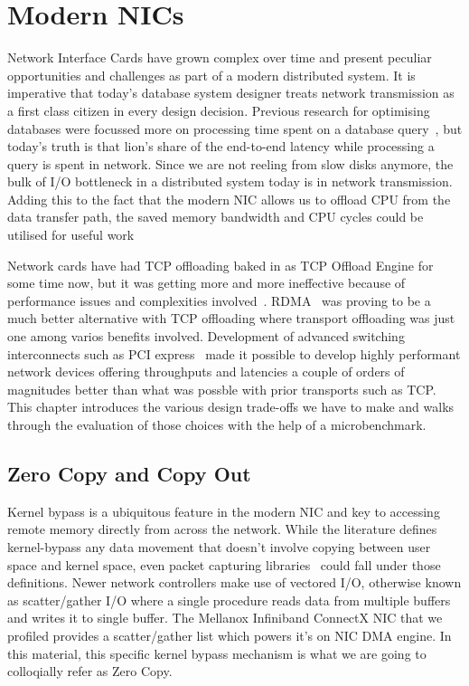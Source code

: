 \chapter{Modern NICs}
\label{chap:modernnics}
Network Interface Cards have grown complex over time and present peculiar opportunities and 
challenges as part of a modern distributed system. It is imperative that today's
database system designer treats network transmission as a first class citizen in every design decision.
Previous research for optimising databases were focussed more on processing time spent on a 
database query~\cite{dbmsproctime}, but today's truth is that lion's share of the end-to-end latency
while processing a query is spent in network.
Since we are not reeling from slow disks anymore, the bulk of I/O bottleneck in a distributed system today is in network transmission.
Adding this to the fact that the modern NIC allows us to offload CPU from the data transfer path,
the saved memory bandwidth and CPU cycles could be utilised for useful work 

Network cards have had TCP offloading baked in as TCP Offload Engine for some time now, but it was getting 
more and more ineffective because of performance issues and complexities involved~\cite{tcpoffload}.
RDMA~\cite{rdmapatent,rdmacase,rdma} was proving to be a much better alternative with TCP offloading where
transport offloading was just one among varios benefits involved. Development of advanced switching 
interconnects such as PCI express~\cite{pcie} made it possible to develop highly performant 
network devices offering throughputs and latencies a couple of orders of magnitudes better
than what was possble with prior transports such as TCP. This chapter introduces the various design 
trade-offs we have to make and walks through the evaluation of those choices with the help of a microbenchmark.


\section{Zero Copy and Copy Out}
Kernel bypass is a ubiquitous feature in the modern NIC and key to accessing remote memory directly 
from across the network. While the literature defines kernel-bypass any data movement that doesn't 
involve copying between user space and kernel space, even packet capturing libraries~\cite{pcap} could fall
under those definitions. Newer network controllers make use of vectored I/O, otherwise known as scatter/gather I/O
where a single procedure reads data from multiple buffers and writes it to single buffer. The Mellanox Infiniband ConnectX
NIC that we profiled provides a scatter/gather list which powers it's on NIC DMA engine. In this material, this specific kernel bypass
mechanism is what we are going to colloqially refer as Zero Copy.

